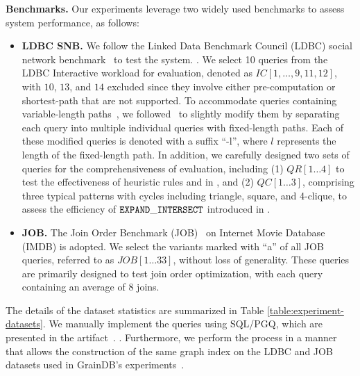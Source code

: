 \noindent\textbf{Benchmarks.} Our experiments leverage two widely used benchmarks to assess system performance, as follows:
\begin{itemize}
    \item \textbf{LDBC SNB.} We follow the Linked Data Benchmark Council (LDBC) social network benchmark~\cite{ldbc_snb} to test the system. .
    We select 10 queries from the LDBC Interactive workload for evaluation, denoted as $IC[1, \ldots, 9, 11, 12]$, with $10$, $13$, and $14$ excluded since they involve either pre-computation or shortest-path that are not supported.
    To accommodate queries containing variable-length paths~\cite{graindb}, we followed~\cite{graindb} to slightly modify them by separating each query into multiple individual queries with fixed-length paths. Each of these modified queries is denoted with a suffix ``-l'', where $l$ represents the length of the fixed-length path. In addition, we carefully designed two sets of queries for the comprehensiveness of evaluation, including (1) $QR[1\ldots 4]$ to test the effectiveness of heuristic rules \filterrule and \joinfuserule in \name, and (2) $QC[1\ldots 3]$, comprising three typical patterns with cycles including triangle, square, and 4-clique, to assess the efficiency of $\texttt{EXPAND}\_\texttt{INTERSECT}$ introduced in .
    \item \textbf{JOB.} The Join Order Benchmark (JOB)~\cite{job_snb} on Internet Movie Database (IMDB) is adopted. We select the variants marked with ``a'' of all JOB queries, referred to as $JOB[1\ldots 33]$, without loss of generality. These queries are primarily designed to test join order optimization, with each query containing an average of $8$ joins.
\end{itemize}
The details of the dataset statistics are summarized in Table \ref{table:experiment-datasets}.
We manually implement the queries using SQL/PGQ, which are presented in the artifact~\cite{artifact}.
.
Furthermore, we perform the \rgmapping process in a manner that allows the construction of the same graph index on the LDBC and JOB datasets used in GrainDB's experiments~\cite{graindb}.


